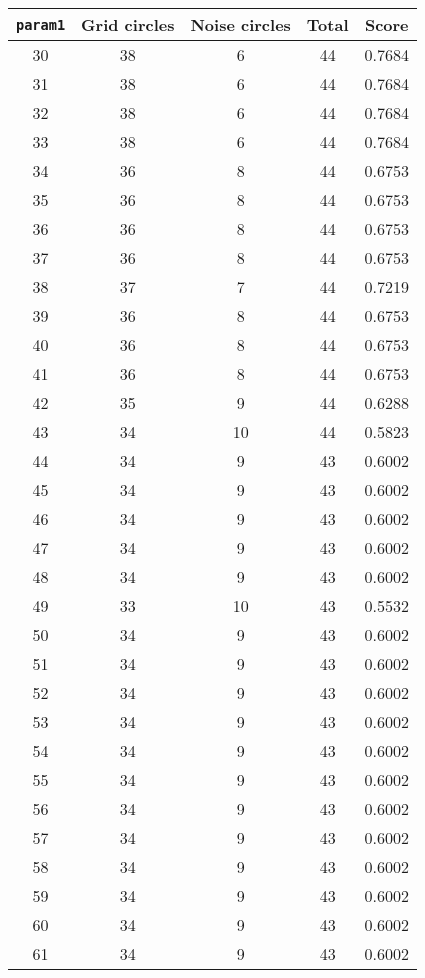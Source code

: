 \documentclass[letterpaper, 12pt]{article}
\begin{document}
\begin{longtable}{|c|c|c|c|c|}
\hline
\textbf{\texttt{param1}} & \textbf{Grid circles} & \textbf{Noise circles} & \textbf{Total} & \textbf{Score} \\
\hline
30 & 38 & 6 & 44 & 0.7684 \\
\hline
31 & 38 & 6 & 44 & 0.7684 \\
\hline
32 & 38 & 6 & 44 & 0.7684 \\
\hline
33 & 38 & 6 & 44 & 0.7684 \\
\hline
34 & 36 & 8 & 44 & 0.6753 \\
\hline
35 & 36 & 8 & 44 & 0.6753 \\
\hline
36 & 36 & 8 & 44 & 0.6753 \\
\hline
37 & 36 & 8 & 44 & 0.6753 \\
\hline
38 & 37 & 7 & 44 & 0.7219 \\
\hline
39 & 36 & 8 & 44 & 0.6753 \\
\hline
40 & 36 & 8 & 44 & 0.6753 \\
\hline
41 & 36 & 8 & 44 & 0.6753 \\
\hline
42 & 35 & 9 & 44 & 0.6288 \\
\hline
43 & 34 & 10 & 44 & 0.5823 \\
\hline
44 & 34 & 9 & 43 & 0.6002 \\
\hline
45 & 34 & 9 & 43 & 0.6002 \\
\hline
46 & 34 & 9 & 43 & 0.6002 \\
\hline
47 & 34 & 9 & 43 & 0.6002 \\
\hline
48 & 34 & 9 & 43 & 0.6002 \\
\hline
49 & 33 & 10 & 43 & 0.5532 \\
\hline
50 & 34 & 9 & 43 & 0.6002 \\
\hline
51 & 34 & 9 & 43 & 0.6002 \\
\hline
52 & 34 & 9 & 43 & 0.6002 \\
\hline
53 & 34 & 9 & 43 & 0.6002 \\
\hline
54 & 34 & 9 & 43 & 0.6002 \\
\hline
55 & 34 & 9 & 43 & 0.6002 \\
\hline
56 & 34 & 9 & 43 & 0.6002 \\
\hline
57 & 34 & 9 & 43 & 0.6002 \\
\hline
58 & 34 & 9 & 43 & 0.6002 \\
\hline
59 & 34 & 9 & 43 & 0.6002 \\
\hline
60 & 34 & 9 & 43 & 0.6002 \\
\hline
61 & 34 & 9 & 43 & 0.6002 \\

\end{longtable}
\end{document}
